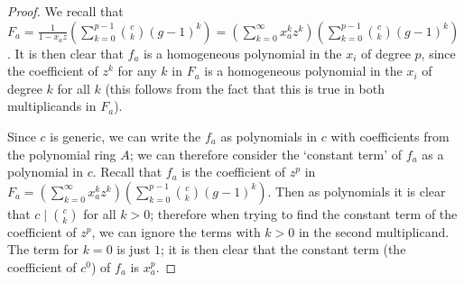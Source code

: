 \documentclass{article}
\numberwithin{equation}{section}
\begin{document}
\begin{proof} 
We recall that $F_a=\frac{1}{1-x_az}\left(\sum_{k=0}^{p-1} \binom{c}{k} (g-1)^k\right)=\left(\sum_{k=0}^\infty x_a^kz^k\right)\left(\sum_{k=0}^{p-1} \binom{c}{k} (g-1)^k\right)$. It is then clear that $f_a$ is a homogeneous polynomial in the $x_i$ of degree $p$, since the coefficient of $z^k$ for any $k$ in $F_a$ is a homogeneous polynomial in the $x_i$ of degree $k$ for all $k$ (this follows from the fact that this is true in both multiplicands in $F_a$). 





Since $c$ is generic, we can write the $f_a$ as polynomials in $c$ with coefficients from the polynomial ring $A$; we can therefore consider the `constant term' of $f_a$ as a polynomial in $c$. Recall that $f_a$ is the coefficient of $z^p$ in $F_a=\left(\sum_{k=0}^\infty x_a^kz^k\right)\left(\sum_{k=0}^{p-1} \binom{c}{k} (g-1)^k\right)$. Then as polynomials it is clear that $c \mid \binom{c}{k}$ for all $k > 0$; therefore when trying to find the constant term of the coefficient of $z^p$, we can ignore the terms with $k > 0$ in the second multiplicand. The term for $k=0$ is just $1$; it is then clear that the constant term (the coefficient of $c^0$) of $f_a$ is $x_a^p$.


\end{proof}
\end{document}

